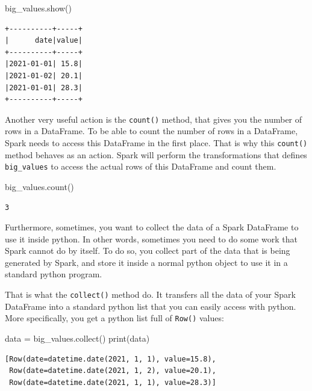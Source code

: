 \documentclass[
  11pt,
  letterpaper,
  DIV=11,
  numbers=noendperiod]{scrreprt}
\newenvironment{Shaded}{\begin{snugshade}}{\end{snugshade}}
\newcommand{\BuiltInTok}[1]{\textcolor[rgb]{0.00,0.23,0.31}{#1}}
\newcommand{\NormalTok}[1]{\textcolor[rgb]{0.00,0.23,0.31}{#1}}
\newcommand{\OperatorTok}[1]{\textcolor[rgb]{0.37,0.37,0.37}{#1}}
\begin{document}
\begin{Shaded}
\begin{Highlighting}[]
\NormalTok{big\_values.show()}
\end{Highlighting}
\end{Shaded}


\begin{verbatim}
+----------+-----+
|      date|value|
+----------+-----+
|2021-01-01| 15.8|
|2021-01-02| 20.1|
|2021-01-01| 28.3|
+----------+-----+
\end{verbatim}

Another very useful action is the \texttt{count()} method, that gives
you the number of rows in a DataFrame. To be able to count the number of
rows in a DataFrame, Spark needs to access this DataFrame in the first
place. That is why this \texttt{count()} method behaves as an action.
Spark will perform the transformations that defines \texttt{big\_values}
to access the actual rows of this DataFrame and count them.

\begin{Shaded}
\begin{Highlighting}[]
\NormalTok{big\_values.count()}
\end{Highlighting}
\end{Shaded}

\begin{verbatim}
3
\end{verbatim}

Furthermore, sometimes, you want to collect the data of a Spark
DataFrame to use it inside python. In other words, sometimes you need to
do some work that Spark cannot do by itself. To do so, you collect part
of the data that is being generated by Spark, and store it inside a
normal python object to use it in a standard python program.

That is what the \texttt{collect()} method do. It transfers all the data
of your Spark DataFrame into a standard python list that you can easily
access with python. More specifically, you get a python list full of
\texttt{Row()} values:

\begin{Shaded}
\begin{Highlighting}[]
\NormalTok{data }\OperatorTok{=}\NormalTok{ big\_values.collect()}
\BuiltInTok{print}\NormalTok{(data)}
\end{Highlighting}
\end{Shaded}

\begin{verbatim}
[Row(date=datetime.date(2021, 1, 1), value=15.8), 
 Row(date=datetime.date(2021, 1, 2), value=20.1), 
 Row(date=datetime.date(2021, 1, 1), value=28.3)]
\end{verbatim}
\end{document}
